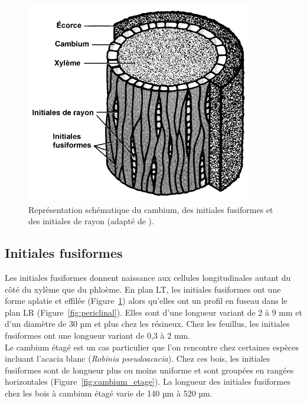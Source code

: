 \begin{figure}[h]
	\centering
	\includegraphics[scale=0.7]{img/ch5_camb_xyl}
	\caption{Représentation schématique du cambium, des initiales fusiformes et des initiales de rayon (adapté de \cite{bowyer2007forest}).}
\label{fig:camb_xyl}
\end{figure}

\subsection{Initiales fusiformes}

Les initiales fusiformes donnent naissance aux cellules longitudinales autant du côté du xylème que du phloème. En plan LT, les initiales fusiformes ont une forme aplatie et effilée (Figure~\ref{fig:camb_xyl}) alors qu'elles ont un profil en fuseau dans le plan LR (Figure~\ref{fig:periclinal}). Elles sont d'une longueur variant de 2 à 9 mm et d'un diamètre de 30 µm et plus chez les résineux. Chez les feuillus, les initiales fusiformes ont une longueur variant de 0,3 à 2 mm.\\

Le cambium étagé est un cas particulier que l'on rencontre chez certaines espèces incluant l'acacia blanc (\textit{Robinia pseudoacacia}). Chez ces bois, les initiales fusiformes sont de longueur plus ou moins uniforme et sont groupées en rangées horizontales (Figure~\ref{fig:cambium_etage}).  La longueur des initiales fusiformes chez les bois à cambium étagé varie de 140 µm à 520 µm.

